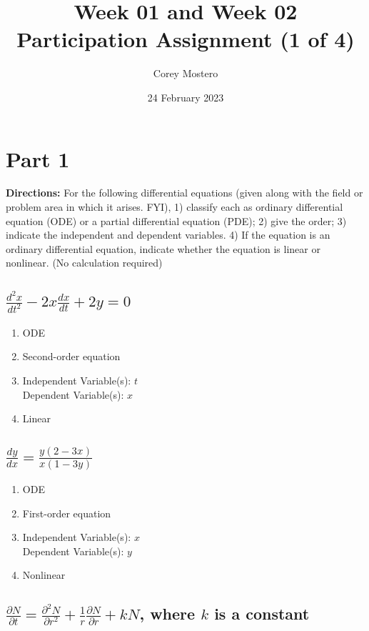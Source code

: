 \documentclass{article}
\title{Week 01 and Week 02 Participation Assignment (1 of 4)}
\date{24 February 2023}
\author{Corey Mostero}
\begin{document}
\maketitle
\newpage

\tableofcontents

\section{Part 1}

\textbf{Directions:} For the following differential equations (given along with the field or problem area in which it arises. FYI), 1) classify each as ordinary differential equation (ODE) or a partial differential equation (PDE); 2) give the order; 3) indicate the independent and dependent variables. 4) If the equation is an ordinary differential equation, indicate whether the equation is linear or nonlinear. (No calculation required)

\subsection{ $ \frac{d^2x}{dt^2} - 2x\frac{dx}{dt} + 2y = 0 $ }

\begin{enumerate}
    \item ODE
    \item Second-order equation
    \item Independent Variable(s): $ t $ \\
          Dependent Variable(s): $ x $
    \item Linear
\end{enumerate}

\subsection{ $ \frac{dy}{dx} = \frac{y(2-3x)}{x(1-3y)} $ }

\begin{enumerate}
    \item ODE
    \item First-order equation
    \item Independent Variable(s): $ x $ \\
          Dependent Variable(s): $ y $
    \item Nonlinear
\end{enumerate}

\subsection{ $ \frac{\partial N}{\partial t} = \frac{\partial^2N}{\partial r^2} + \frac{1}{r}\frac{\partial N}{\partial r} + kN $, where $ k $ is a constant }
\end{document}
